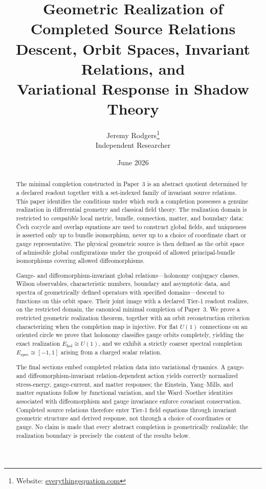 \documentclass[11pt,a4paper]{article}
\theoremstyle{plain}
\theoremstyle{definition}
\theoremstyle{remark}
\begin{document}
\title{\textbf{Geometric Realization of Completed Source Relations}\\[0.35em]
\large Descent, Orbit Spaces, Invariant Relations, and\\
Variational Response in Shadow Theory}
\author{Jeremy Rodgers\thanks{Website: \href{https://everythingequation.com}{everythingequation.com}}\\
\normalsize Independent Researcher}
\date{June 2026}
\maketitle

\begin{abstract}
The minimal completion constructed in Paper~3 is an abstract quotient determined by a
declared readout together with a set-indexed family of invariant source relations. This
paper identifies the conditions under which such a completion possesses a genuine
realization in differential geometry and classical field theory. The realization domain is
restricted to \emph{compatible} local metric, bundle, connection, matter, and boundary data:
\v{C}ech cocycle and overlap equations are used to construct global fields, and uniqueness is
asserted only up to bundle isomorphism, never up to a choice of coordinate chart or gauge
representative. The physical geometric source is then defined as the orbit space of admissible
global configurations under the groupoid of allowed principal-bundle isomorphisms covering
allowed diffeomorphisms.

Gauge- and diffeomorphism-invariant global relations---holonomy conjugacy classes, Wilson
observables, characteristic numbers, boundary and asymptotic data, and spectra of geometrically
defined operators with specified domains---descend to functions on this orbit space. Their joint
image with a declared Tier-1 readout realizes, on the restricted domain, the canonical minimal
completion of Paper~3. We prove a restricted geometric realization theorem, together with an
orbit reconstruction criterion characterizing when the completion map is injective. For flat
$U(1)$ connections on an oriented circle we prove that holonomy classifies gauge orbits
completely, yielding the exact realization $E_{\mathrm{hol}}\cong U(1)$, and we exhibit a
strictly coarser spectral completion $E_{\mathrm{spec}}\cong[-1,1]$ arising from a charged
scalar relation.

The final sections embed completed relation data into variational dynamics. A gauge- and
diffeomorphism-invariant relation-dependent action yields correctly normalized stress-energy,
gauge-current, and matter responses; the Einstein, Yang--Mills, and matter equations follow by
functional variation, and the Ward--Noether identities associated with diffeomorphism and gauge
invariance enforce covariant conservation. Completed source relations therefore enter Tier-1
field equations through invariant geometric structure and derived response, not through a
choice of coordinates or gauge. No claim is made that every abstract completion is
geometrically realizable; the realization boundary is precisely the content of the results
below.
\end{abstract}
\end{document}
